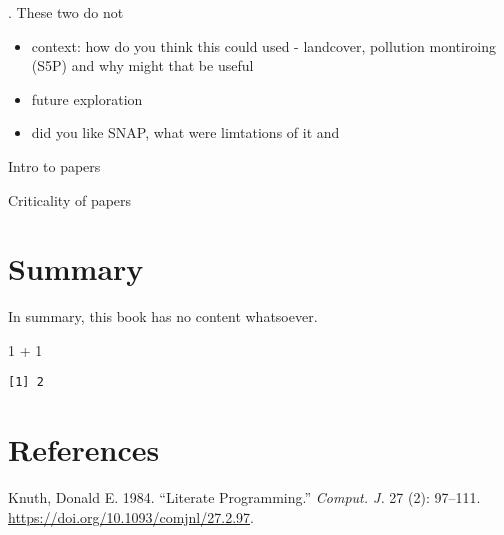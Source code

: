 \documentclass[
  letterpaper,
  DIV=11,
  numbers=noendperiod]{scrreprt}
\newenvironment{Shaded}{\begin{snugshade}}{\end{snugshade}}
\newcommand{\DecValTok}[1]{\textcolor[rgb]{0.68,0.00,0.00}{#1}}
\newcommand{\SpecialCharTok}[1]{\textcolor[rgb]{0.37,0.37,0.37}{#1}}
\newlength{\cslhangindent}
\newlength{\cslentryspacingunit} %
\newenvironment{CSLReferences}[2] %
 {%
  \setlength{\parindent}{0pt}
  \ifodd #1
  \let\oldpar\par
  \def\par{\hangindent=\cslhangindent\oldpar}
  \fi
  \setlength{\parskip}{#2\cslentryspacingunit}
 }%
 {}
\begin{document}
. These two do not

\begin{itemize}
\item
  context: how do you think this could used - landcover, pollution
  montiroing (S5P) and why might that be useful
\item
  future exploration
\item
  did you like SNAP, what were limtations of it and
\end{itemize}

Intro to papers

Criticality of papers


\hypertarget{summary}{%
\chapter{Summary}\label{summary}}

In summary, this book has no content whatsoever.

\begin{Shaded}
\begin{Highlighting}[]
\DecValTok{1} \SpecialCharTok{+} \DecValTok{1}
\end{Highlighting}
\end{Shaded}

\begin{verbatim}
[1] 2
\end{verbatim}


\hypertarget{references}{%
\chapter*{References}\label{references}}


\hypertarget{refs}{}
\begin{CSLReferences}{1}{0}
\leavevmode{}%
Knuth, Donald E. 1984. {``Literate Programming.''} \emph{Comput. J.} 27
(2): 97--111. \url{https://doi.org/10.1093/comjnl/27.2.97}.

\end{CSLReferences}
\end{document}
